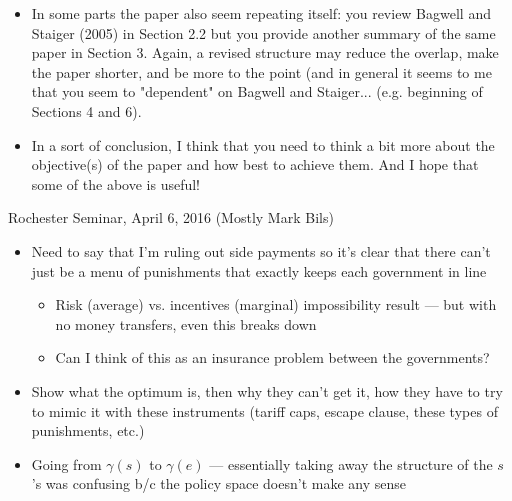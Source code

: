 \documentclass[12pt]{article}
\newcommand{\ga}{\gamma}
\begin{document}
\begin{itemize}
	\item In some parts the paper also seem repeating itself: you review Bagwell and Staiger (2005) in Section 2.2 but you provide another summary of the same paper in Section 3. Again, a revised structure may reduce the overlap, make the paper shorter, and be more to the point (and in general it seems to me that you seem to "dependent" on Bagwell and Staiger... (e.g. beginning of Sections 4 and 6).
	\item In a sort of conclusion, I think that you need to think a bit more about the objective(s) of the paper and how best to achieve them. And I hope that some of the above is useful!
\end{itemize}

\newpage
Rochester Seminar, April 6, 2016 (Mostly Mark Bils)
\begin{itemize}
	\item Need to say that I'm ruling out side payments so it's clear that there can't just be a menu of punishments that exactly keeps each government in line
		\begin{itemize}
			\item Risk (average) vs. incentives (marginal) impossibility result --- but with no money transfers, even this breaks down
			\item Can I think of this as an insurance problem between the governments?
		\end{itemize}
	\item Show what the optimum is, then why they can't get it, how they have to try to mimic it with these instruments (tariff caps, escape clause, these types of punishments, etc.)
	\item Going from $\ga(s)$ to $\ga(e)$ --- essentially taking away the structure of the $s$'s was confusing b/c the policy space doesn't make any sense
\end{itemize}
\end{document}
